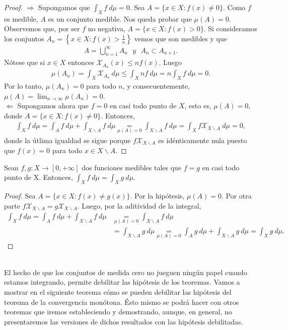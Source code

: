 \begin{proof}
$\Longrightarrow$ Supongamos que $\int_{X}{f \ d\mu} = 0$. Sea $A = \{x \in X : f(x) \not = 0\}$. Como $f$ es medible, $A$ es un conjunto medible. Nos queda probar que $\mu(A) = 0$. Observemos que, por ser $f$ no negativa, $A = \{x \in X : f(x) > 0\}$. Si consideramos los conjuntos $A_n = \left\{x \in X : f(x) > \frac{1}{n}\right\}$ vemos que son medibles y que
\begin{align*}
    A = \bigcup_{n=1}^{\infty}{A_n} \ \ \ y \ \ \ A_n \subset A_{n+1}.
\end{align*}
Nótese que si $x \in X$ entonces  $\mathcal{X}_{A_n}(x) \leq nf(x)$. Luego
\begin{align*}
    \mu(A_n) = \int_{X}{\mathcal{X}_{A_n} \ d\mu} \leq \int_{X}{nf \ d\mu} = n\int_{X}{f \ d\mu} = 0.
\end{align*}
Por lo tanto, $\mu(A_n) = 0$ para todo $n$, y consecuentemente, $\mu(A) = \lim_{n \to \infty}{\mu(A_n)} = 0$.
\\
\newline
$\Longleftarrow$ Supongamos ahora que $f = 0$ en casi todo punto de $X$, esto es, $\mu(A) = 0$, donde $A = \{ x \in X : f(x) \not = 0\}$. Entonces,
\begin{align*}
    \int_{X}{f \ d\mu} = \int_{A}{f \ d\mu} + \int_{X \backslash A}{f \ d\mu} \underset{\mu(A) = 0}{=} \int_{X \backslash A}{f \ d\mu} = \int_{X}{f\mathcal{X}_{X \backslash A} \ d\mu} = 0,
\end{align*}
donde la útlima igualdad se sigue porque $f \mathcal{X}_{X \backslash A}$ es idénticamente nula puesto que $f(x) = 0$ para todo $x \in X \backslash A$.
\end{proof}

\begin{prop}
Sean $f,g: X \longrightarrow [0,+\infty]$ dos funciones medibles tales que $f = g$ en casi todo punto de X. Entonces, $\int_{X}{f \ d\mu} = \int_{X}{g \ d\mu}$.
\end{prop}

\begin{proof}
Sea $A = \{ x \in X : f(x) \not = g(x)\}$. Por la hipótesis, $\mu(A) = 0$. Por otra parte $f\mathcal{X}_{X \backslash A} = g\mathcal{X}_{X \backslash A}$. Luego, por la aditividad de la integral,
\begin{align*}
    \int_{X}{f \ d\mu}  = \int_{A}{f \ d\mu} + \int_{X \backslash A}{f \ d\mu} &\underset{\mu(A) = 0}{=} \int_{X \backslash A}{f \ d\mu}\\
    &= \int_{X \backslash A}{g \ d\mu} \underset{\mu(A) = 0}{=} \int_{A}{g \ d\mu} + \int_{X \backslash A}{g \ d\mu} = \int_{X}{g \ d\mu}.
\end{align*}
\end{proof}
\\
\newline
El hecho de que los conjuntos de medida cero no jueguen ningún papel cuando estamos integrando, permite debilitar las hipótesis de los teoremas. Vamos a mostrar en el siguiente teorema cómo se pueden debilitar las hipótesis del teorema de la convergencia monótona. Ésto mismo se podrá hacer con otros teoremas que iremos estableciendo y demostrando, aunque, en general, no presentaremos las versiones de dichos resultados con las hipótesis debilitadas.

